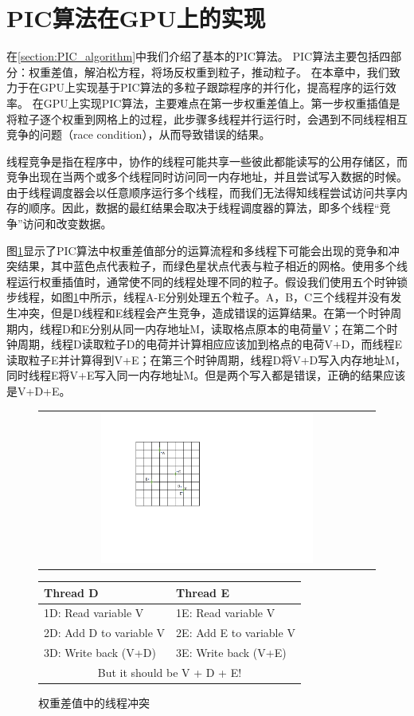 \section{PIC算法在GPU上的实现}
在\ref{section:PIC_algorithm}中我们介绍了基本的PIC算法。
PIC算法主要包括四部分：权重差值，解泊松方程，将场反权重到粒子，推动粒子。
在本章中，我们致力于在GPU上实现基于PIC算法的多粒子跟踪程序的并行化，提高程序的运行效率。
在GPU上实现PIC算法，主要难点在第一步权重差值上。第一步权重插值是将粒子逐个权重到网格上的过程，此步骤多线程并行运行时，会遇到不同线程相互竞争的问题（race condition），从而导致错误的结果。

线程竞争是指在程序中，协作的线程可能共享一些彼此都能读写的公用存储区，而竞争出现在当两个或多个线程同时访问同一内存地址，并且尝试写入数据的时候。由于线程调度器会以任意顺序运行多个线程，而我们无法得知线程尝试访问共享内存的顺序。因此，数据的最红结果会取决于线程调度器的算法，即多个线程“竞争”访问和改变数据。

图\ref{fig:PIC_weighting_threading}显示了PIC算法中权重差值部分的运算流程和多线程下可能会出现的竞争和冲突结果，其中蓝色点代表粒子，而绿色星状点代表与粒子相近的网格。使用多个线程运行权重插值时，通常使不同的线程处理不同的粒子。假设我们使用五个时钟锁步线程，如图\ref{fig:PIC_weighting_threading}中所示，线程A-E分别处理五个粒子。A，B，C三个线程并没有发生冲突，但是D线程和E线程会产生竞争，造成错误的运算结果。在第一个时钟周期内，线程D和E分别从同一内存地址M，读取格点原本的电荷量V；在第二个时钟周期，线程D读取粒子D的电荷并计算相应应该加到格点的电荷V+D，而线程E读取粒子E并计算得到V+E；在第三个时钟周期，线程D将V+D写入内存地址M，同时线程E将V+E写入同一内存地址M。但是两个写入都是错误，正确的结果应该是V+D+E。

\begin{figure}[!htb]
  \centering
  \begin{tabular}{|l|l|}
    \multicolumn{2}{c}{
    \includegraphics[width=0.65\textwidth]{Img/3PIC_weighting.pdf}} \\
  \end{tabular}
  \begin{tabular}{|l|l|}
    \hline
    Thread D & Thread E  \\
    \hline
    1D: Read variable V     & 1E: Read variable V     \\
    2D: Add D to variable V & 2E: Add E to variable V \\
    3D: Write back (V+D)    & 3E: Write back (V+E)    \\
    \hline
    \multicolumn{2}{c}{But it should be V + D + E!}
  \end{tabular}
  \caption{权重差值中的线程冲突}
  \label{fig:PIC_weighting_threading}
\end{figure}

